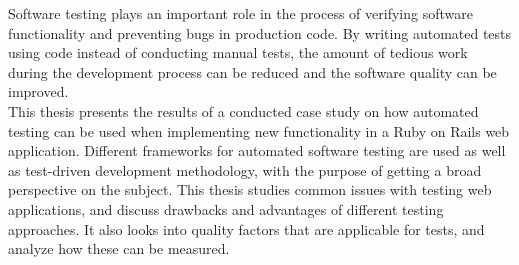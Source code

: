 Software testing plays an important role in the process of verifying
software functionality and preventing bugs in production code. By
writing automated tests using code instead of conducting manual tests,
the amount of tedious work during the development process can be reduced
and the software quality can be improved.\\

This thesis presents the results of a conducted case study on how
automated testing can be used when implementing new functionality in a
Ruby on Rails web application. Different frameworks for automated
software testing are used as well as test-driven development
methodology, with the purpose of getting a broad perspective on the
subject. This thesis studies common issues with testing web
applications, and discuss drawbacks and advantages of different testing
approaches. It also looks into quality factors that are applicable for
tests, and analyze how these can be measured.\\
